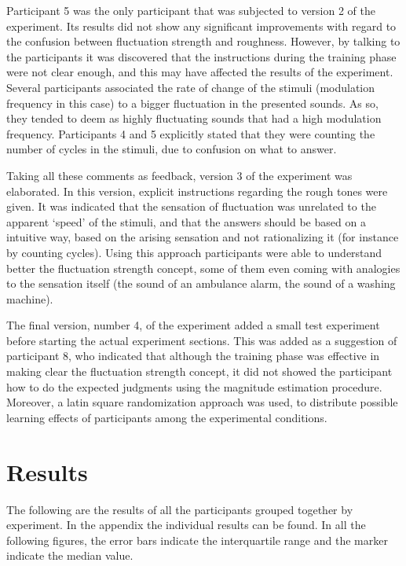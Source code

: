 \documentclass[../main.tex]{subfiles}
\begin{document}
Participant 5 was the only participant that was subjected to version 2 of the
experiment. Its results did not show any significant improvements with regard
to the confusion between fluctuation strength and roughness. However, by talking
to the participants it was discovered that the instructions during the training
phase were not clear enough, and this may have affected the results of the
experiment. Several participants associated the rate of change of the stimuli
(modulation frequency in this case) to a bigger fluctuation in the presented
sounds. As so, they tended to deem as highly fluctuating sounds that had a high
modulation frequency. Participants 4 and 5 explicitly stated that they were
counting the number of cycles in the stimuli, due to confusion on what to
answer.

Taking all these comments as feedback, version 3 of the experiment was
elaborated. In this version, explicit instructions regarding the rough tones
were given. It was indicated that the sensation of fluctuation was unrelated to
the apparent `speed' of the stimuli, and that the answers should be based on a
intuitive way, based on the arising sensation and not rationalizing it (for
instance by counting cycles). Using this approach participants were able to
understand better the fluctuation strength concept, some of them even coming
with analogies to the sensation itself (the sound of an ambulance alarm, the
sound of a washing machine).

The final version, number 4, of the experiment added a small test experiment
before starting the actual experiment sections. This was added as a suggestion
of participant 8, who indicated that although the training phase was effective
in making clear the fluctuation strength concept, it did not showed the
participant how to do the expected judgments using the magnitude estimation
procedure. Moreover, a latin square randomization approach was used, to
distribute possible learning effects of participants among the experimental
conditions.

\section{Results}

The following are the results of all the participants grouped together by
experiment. In the appendix the individual results can be found. In all the
following figures, the error bars indicate the interquartile range and the
marker indicate the median value.
\end{document}
